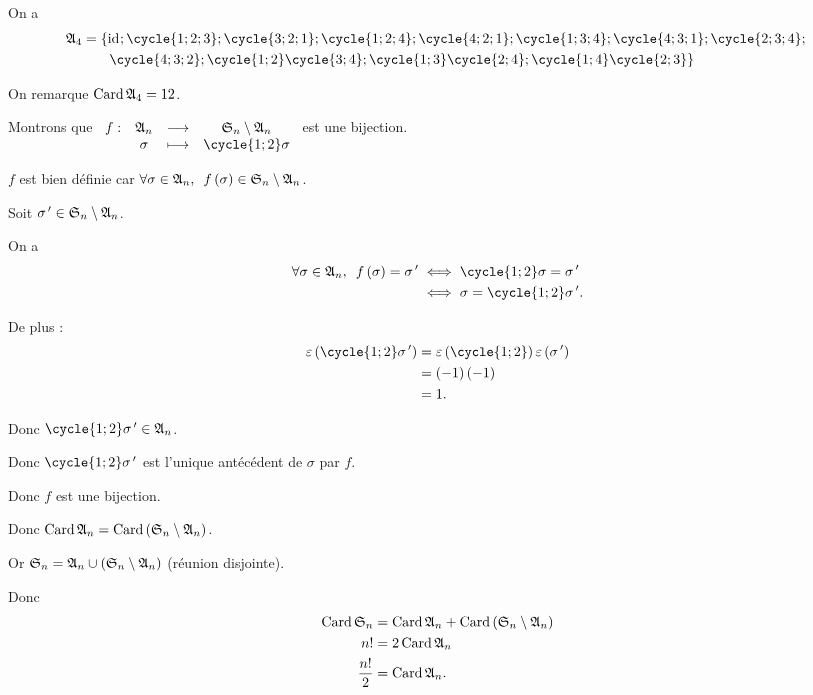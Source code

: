 \begin{corr}[1]
On a \[\begin{aligned}
\frakA{4}&=\left\lbrace\id{};\cycle{1;2;3};\cycle{3;2;1};\cycle{1;2;4};\cycle{4;2;1};\cycle{1;3;4};\cycle{4;3;1};\cycle{2;3;4};\right. \\
&\color{white}=\lbrace\color{black}\left.\cycle{4;3;2};\cycle{1;2}\cycle{3;4};\cycle{1;3}\cycle{2;4};\cycle{1;4}\cycle{2;3}\right\rbrace
\end{aligned}\]

On remarque \(\operatorname{Card}\frak{A}_{4}=12\).
\end{corr}

\begin{corr}[2]
Montrons que \(\fonction{f}{\frakA{n}}{\S{n}\excluant\frakA{n}}{\sigma}{\cycle{1;2}\sigma}\) est une bijection.

\(f\) est bien définie car \(\quantifs{\forall\sigma\in\frakA{n}}f\paren{\sigma}\in\S{n}\excluant\frakA{n}\).

Soit \(\sigma^{\,\prime}\in\frak{S}_{n}\setminus\frak{A}_{n}\).

On a \[\begin{aligned}
\quantifs{\forall\sigma\in\frakA{n}}f\paren{\sigma}=\sigma\prim&\ssi\cycle{1;2}\sigma=\sigma\prim \\
&\ssi\sigma=\cycle{1;2}\sigma\prim.
\end{aligned}\]

De plus : \[\begin{aligned}
\epsilon\paren{\cycle{1;2}\sigma\prim}&=\epsilon\paren{\cycle{1;2}}\epsilon\paren{\sigma\prim} \\
&=\paren{-1}\paren{-1} \\
&=1.
\end{aligned}\]

Donc \(\cycle{1;2}\sigma\prim\in\frakA{n}\).

Donc \(\cycle{1;2}\sigma\prim\) est l'unique antécédent de \(\sigma\) par \(f\).

Donc \(f\) est une bijection.

Donc \(\operatorname{Card}\frak{A}_{n}=\operatorname{Card}\left(\frak{S}_{n}\setminus\frak{A}_{n}\right)\).

Or \(\frak{S}_{n}=\frak{A}_{n}\cup\left(\frak{S}_{n}\setminus\frak{A}_{n}\right)\) (réunion disjointe).

Donc \[\begin{aligned}
\operatorname{Card}\frak{S}_{n}&=\operatorname{Card}\frak{A}_{n}+\operatorname{Card}\left(\frak{S}_{n}\setminus\frak{A}_{n}\right) \\
n!&=2\operatorname{Card}\frak{A}_{n} \\
\dfrac{n!}{2}&=\operatorname{Card}\frak{A}_{n}.
\end{aligned}\]
\end{corr}

